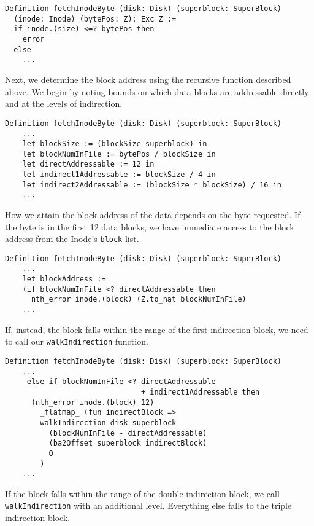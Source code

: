 \documentclass[nocopyrightspace]{sigplanconf}
\begin{document}
\begin{lstlisting}
Definition fetchInodeByte (disk: Disk) (superblock: SuperBlock)
  (inode: Inode) (bytePos: Z): Exc Z :=
  if inode.(size) <=? bytePos then 
    error
  else 
    ...
\end{lstlisting}

Next, we determine the block address using the recursive function described
above. We begin by noting bounds on which data blocks are addressable directly
and at the levels of indirection.

\begin{lstlisting}
Definition fetchInodeByte (disk: Disk) (superblock: SuperBlock)
    ...
    let blockSize := (blockSize superblock) in
    let blockNumInFile := bytePos / blockSize in
    let directAddressable := 12 in
    let indirect1Addressable := blockSize / 4 in
    let indirect2Addressable := (blockSize * blockSize) / 16 in
    ...
\end{lstlisting}

How we attain the block address of the data depends on the byte requested. If
the byte is in the first 12 data blocks, we have immediate access to the block
address from the Inode's {\tt block} list.

\begin{lstlisting}
Definition fetchInodeByte (disk: Disk) (superblock: SuperBlock)
    ...
    let blockAddress :=
    (if blockNumInFile <? directAddressable then
      nth_error inode.(block) (Z.to_nat blockNumInFile)
    ...
\end{lstlisting}

If, instead, the block falls within the range of the first indirection block,
we need to call our {\tt walkIndirection} function.

\begin{lstlisting}
Definition fetchInodeByte (disk: Disk) (superblock: SuperBlock)
    ...
     else if blockNumInFile <? directAddressable
                               + indirect1Addressable then
      (nth_error inode.(block) 12) 
        _flatmap_ (fun indirectBlock =>
        walkIndirection disk superblock
          (blockNumInFile - directAddressable)
          (ba2Offset superblock indirectBlock) 
          O
        )
    ...
\end{lstlisting}

If the block falls within the range of the double indirection block, we call
{\tt walkIndirection} with an additional level. Everything else falls to the
triple indirection block.
\end{document}

